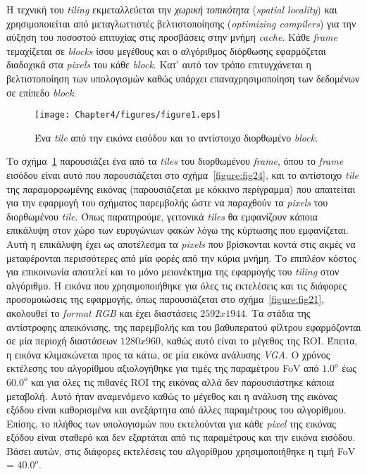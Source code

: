 Η τεχνική του \textsl{tiling} εκμεταλλεύεται την \textsl{χωρική τοπικότητα} (\textsl{spatial locality}) και χρησιμοποιείται από μεταγλωττιστές βελτιστοποίησης (\textsl{optimizing compilers}) για την αύξηση του ποσοστού επιτυχίας στις προσβάσεις στην μνήμη \textsl{cache}. Κάθε \textsl{frame} τεμαχίζεται σε \textsl{blocks} ίσου μεγέθους και ο αλγόριθμος διόρθωσης εφαρμόζεται διαδοχικά στα \textsl{pixels} του κάθε \textsl{block}. Κατ' αυτό τον τρόπο επιτυγχάνεται η βελτιστοποίηση των υπολογισμών καθώς υπάρχει επαναχρησιμοποίηση των δεδομένων σε επίπεδο \textsl{block}.
\begin{figure}
\centering
\texttt{[image: Chapter4/figures/figure1.eps]}
\caption{Ένα \textsl{tile} από την εικόνα εισόδου και το αντίστοιχο διορθωμένο \textsl{block}.}
\label{figure:fig41}
\end{figure}
Το σχήμα~\ref{figure:fig41} παρουσιάζει ένα από τα \textsl{tiles} του διορθωμένου \textsl{frame}, όπου το \textsl{frame} εισόδου είναι αυτό που παρουσιάζεται στο σχήμα~\ref{figure:fig24}, και το αντίστοιχο \textsl{tile} της παραμορφωμένης εικόνας (παρουσιάζεται με κόκκινο περίγραμμα) που απαιτείται για την εφαρμογή του σχήματος παρεμβολής ώστε να παραχθούν τα \textsl{pixels} του διορθωμένου \textsl{tile}. Όπως παρατηρούμε, γειτονικά \textsl{tiles} θα εμφανίζουν κάποια επικάλυψη στον χώρο των ευρυγώνιων φακών λόγω της κύρτωσης που εμφανίζεται. Αυτή η επικάλυψη έχει ως αποτέλεσμα τα \textsl{pixels} που βρίσκονται κοντά στις ακμές να μεταφέρονται περισσότερες από μία φορές από την κύρια μνήμη. Το επιπλέον κόστος για επικοινωνία αποτελεί και το μόνο μειονέκτημα της εφαρμογής του \textsl{tiling} στον αλγόριθμο.\newline \indent
Η εικόνα που χρησιμοποιήθηκε για όλες τις εκτελέσεις και τις διάφορες προσομοιώσεις της εφαρμογής, όπως παρουσιάζεται στο σχήμα~\ref{figure:fig21}, ακολουθεί το \textsl{format} \textsl{RGB} και έχει διαστάσεις \(2592x1944\). Τα στάδια της αντίστροφης απεικόνισης, της παρεμβολής και του βαθυπερατού φίλτρου εφαρμόζονται σε μία περιοχή διαστάσεων \(1280x960\), καθώς αυτό είναι το μέγεθος της \ac{ROI}. Έπειτα, η εικόνα κλιμακώνεται προς τα κάτω, σε μία εικόνα ανάλυσης \textsl{VGA}.\newline \indent
Ο χρόνος εκτέλεσης του αλγορίθμου αξιολογήθηκε για τιμές της παραμέτρου \ac{FoV} από \(1.0^{o}\) έως \(60.0^{o}\) και για όλες τις πιθανές \ac{ROI} της εικόνας αλλά δεν παρουσιάστηκε κάποια μεταβολή. Αυτό ήταν αναμενόμενο καθώς το μέγεθος και η ανάλυση της εικόνας εξόδου είναι καθορισμένα και ανεξάρτητα από άλλες παραμέτρους του αλγορίθμου. Επίσης, το πλήθος των υπολογισμών που εκτελούνται για κάθε \textsl{pixel} της εικόνας εξόδου είναι σταθερό και δεν εξαρτάται από τις παραμέτρους και την εικόνα εισόδου. Βάσει αυτών, στις διάφορες εκτελέσεις του αλγορίθμου χρησιμοποιήθηκε η τιμή \ac{FoV} = \(40.0^{o}\).\newline \indent
